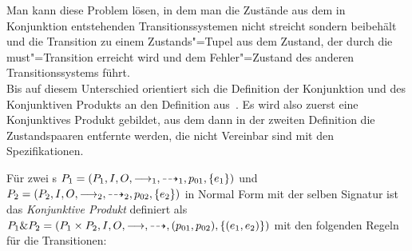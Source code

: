 Man kann diese Problem lösen, in dem man die Zustände aus dem in Konjunktion
entstehenden Transitionssystemen nicht streicht sondern beibehält und die
Transition zu einem Zustands"=Tupel aus dem Zustand, der durch die
must"=Transition erreicht wird und dem Fehler"=Zustand des anderen
Transitionssystems führt.\\
Bis auf diesem Unterschied orientiert sich die Definition der Konjunktion und
des Konjunktiven Produkts an den Definition aus~\cite{Vogler2016MIA3}. Es wird
also zuerst eine Konjunktives Produkt gebildet, aus dem dann in der zweiten
Definition die Zustandspaaren entfernte werden, die nicht Vereinbar sind mit den
Spezifikationen.

\begin{Def}
  Für zwei \MEIO{}s $P_1 = (P_1,I,O,\must _1,\may _1,p_{01},\{e_1\})$ und $P_2
  = (P_2,I,O,\must _2,\may _2,p_{02},\{e_2\})$ in Normal Form mit der selben
  Signatur ist das \emph{Konjunktive Produkt} definiert als $P_1\& P_2 =
  (P_1\times P_2, I, O, \must, \may ,(p_{01},p_{02}),\{(e_1,e_2)\})$ mit den
  folgenden Regeln für die Transitionen:
\end{Def}
